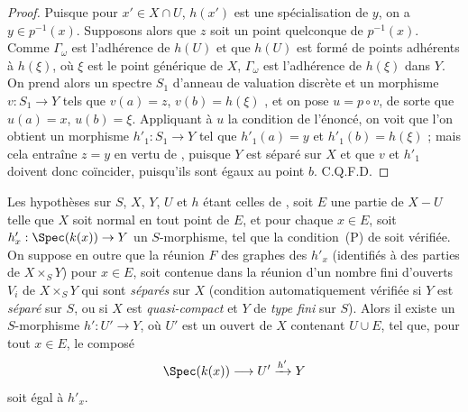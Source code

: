 \begin{proof}
Puisque pour $x'\in X\cap U$, $h(x')$ est une spécialisation de $y$, on a $y\in p^{-1}(x)$.
Supposons alors que $z$ soit un point quelconque de $p^{-1}(x)$.
Comme $\Gamma_\omega$ est l'adhérence de $h(U)$ et que $h(U)$ est formé de points adhérents à $h(\xi)$, où $\xi$ est le point générique de $X$, $\Gamma_\omega$ est l'adhérence de $h(\xi)$ dans $Y$.
On prend alors un spectre $S_1$ d'anneau de valuation discrète et un morphisme $v:S_1\to Y$ tels que $v(a)=z$, $v(b)=h(\xi)$ , et on pose $u=p\circ v$, de sorte que $u(a)=x$, $u(b)=\xi$.
Appliquant à $u$ la condition de l'énoncé, on voit que l'on obtient un morphisme $h'_1:S_1\to Y$ tel que $h'_1(a)=y$ et $h'_1(b)=h(\xi)$ ; mais cela entraîne $z=y$ en vertu de , puisque $Y$ est séparé sur $X$ et que $v$ et $h'_1$ doivent donc coïncider, puisqu'ils sont égaux au point $b$.
C.Q.F.D.
\end{proof}

\begin{corollary}[20.4.7]
\label{IV.20.4.7}
Les hypothèses sur $S$, $X$, $Y$, $U$ et $h$ étant celles de , soit $E$ une partie de $X-U$ telle que $X$ soit normal en tout point de $E$, et pour chaque $x\in E$, soit $h'_x:\Spec(k(x))\to Y$ un $S$-morphisme, tel que la condition~(P) de  soit vérifiée.
On suppose en outre que la réunion $F$ des graphes des $h'_x$ (identifiés à des parties de $X\times_S Y$) pour $x\in E$, soit contenue dans la réunion d'un nombre fini d'ouverts $V_i$ de $X\times_S Y$ qui sont \emph{séparés} sur $X$ (condition automatiquement vérifiée si $Y$ est \emph{séparé} sur $S$, ou si $X$ est \emph{quasi-compact} et $Y$ de \emph{type fini} sur $S$).
Alors il existe un $S$-morphisme $h':U'\to Y$, où $U'$ est un ouvert de $X$ contenant $U\cup E$, tel que, pour tout $x\in E$, le composé
\[
  \Spec(k(x))\to U'\xrightarrow{h'}Y
\]
soit égal à $h'_x$.
\end{corollary}

